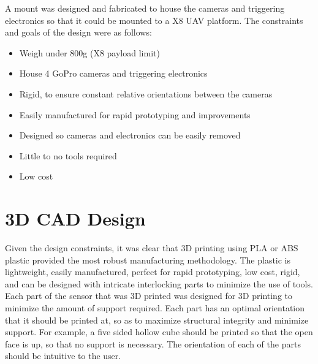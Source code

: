 A mount was designed and fabricated to house the cameras and triggering electronics so that it could be mounted to a X8 UAV platform.  The constraints and goals of the design were as follows:
\begin{itemize}
	\item Weigh under 800g (X8 payload limit)
	\item House 4 GoPro cameras and triggering electronics
	\item Rigid, to ensure constant relative orientations between the cameras
	\item Easily manufactured for rapid prototyping and improvements
	\item Designed so cameras and electronics can be easily removed
	\item Little to no tools required
	\item Low cost 
\end{itemize}
\section{3D CAD Design}
Given the design constraints, it was clear that 3D printing using PLA or ABS plastic provided the most robust manufacturing methodology. The plastic is lightweight, easily manufactured, perfect for rapid prototyping, low cost, rigid, and can be designed with intricate interlocking parts to minimize the use of tools.  Each part of the sensor that was 3D printed was designed for 3D printing to minimize the amount of support required.  Each part has an optimal orientation that it should be printed at, so as to maximize structural integrity and minimize support. For example, a five sided hollow cube should be printed so that the open face is up, so that no support is necessary.  The orientation of each of the parts should be intuitive to the user.
